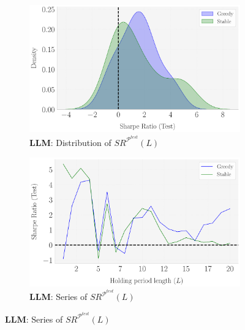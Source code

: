 \begin{figure}[H]
  \bx 
      \begin{subfigure}[b]{0.44\textwidth}
    \centering
    \includegraphics[width=\textwidth]{fig_8c_LLAMA_RobustnessCheck_SR_Test_Set_Distribution_[Change_L].pdf}
    \caption{\textbf{LLM}: Distribution of $SR^{\mathcal P^{test}}(L)$}
    \label{fig:LLM_Robustness_L_Distr}
  \end{subfigure}
  \hspace{0.05\textwidth} %
  \begin{subfigure}[b]{0.44\textwidth}
    \centering
    \includegraphics[width=\textwidth]{fig_8d_LLAMA_RobustnessCheck_SR_Test_Set_vs_L_[Change_L].pdf}
    \caption{\textbf{LLM}: Series of $SR^{\mathcal P^{test}}(L)$}
    \label{fig:LLM_Robustness_L_Series}
  \end{subfigure}
\label{fig:LLM_Robustness_L}
\mx 

\end{figure}
